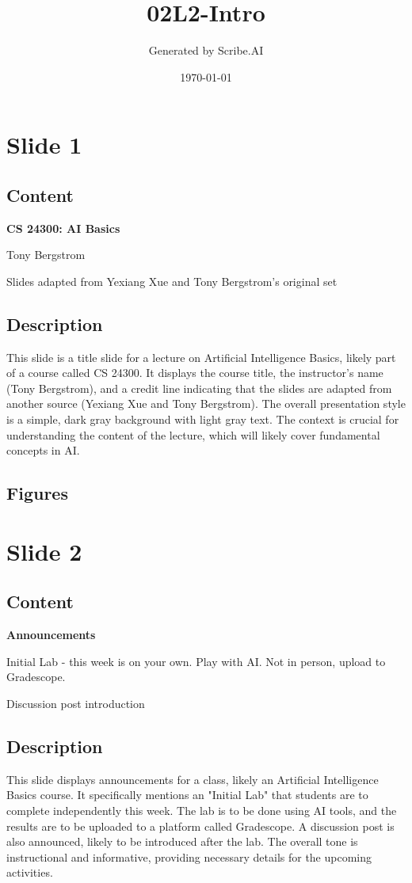 \documentclass{article}%
\title{02L2{-}Intro}%
\author{Generated by Scribe.AI}%
\date{\today}%
\begin{document}
%
\normalsize%
\maketitle%
\section{Slide 1}%
\label{sec:Slide1}%
\subsection{Content}%

\textbf{CS 24300: AI Basics}

Tony Bergstrom

Slides adapted from Yexiang Xue and Tony Bergstrom's original set
%
\subsection{Description}%
This slide is a title slide for a lecture on Artificial Intelligence Basics, likely part of a course called CS 24300.  It displays the course title, the instructor's name (Tony Bergstrom), and a credit line indicating that the slides are adapted from another source (Yexiang Xue and Tony Bergstrom).  The overall presentation style is a simple, dark gray background with light gray text.  The context is crucial for understanding the content of the lecture, which will likely cover fundamental concepts in AI.%
\subsection{Figures}%
\begin{figure}[H]%
\centering%
\end{figure}

%
\newpage%
\section{Slide 2}%
\label{sec:Slide2}%
\subsection{Content}%

\textbf{Announcements}

Initial Lab - this week is on your own. Play with AI. Not in person, upload to Gradescope.

Discussion post introduction
%
\subsection{Description}%
This slide displays announcements for a class, likely an Artificial Intelligence Basics course.  It specifically mentions an "Initial Lab" that students are to complete independently this week.  The lab is to be done using AI tools, and the results are to be uploaded to a platform called Gradescope.  A discussion post is also announced, likely to be introduced after the lab. The overall tone is instructional and informative, providing necessary details for the upcoming activities.%
\end{document}
